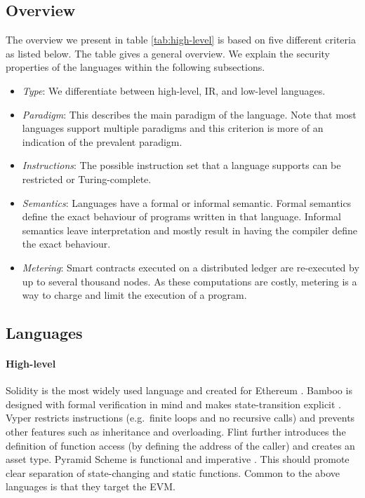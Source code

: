 \subsection{Overview}
The overview we present in table \ref{tab:high-level} is based on five different criteria as listed below. The table gives a general overview. We explain the security properties of the languages within the following subsections.
\begin{itemize}
\item \emph{Type}: We differentiate between high-level, IR, and low-level languages.
\item \emph{Paradigm}: This describes the main paradigm of the language. Note that most languages support multiple paradigms and this criterion is more of an indication of the prevalent paradigm.
\item \emph{Instructions}: The possible instruction set that a language supports can be restricted or Turing-complete.
\item \emph{Semantics}: Languages have a formal or informal semantic. Formal semantics define the exact behaviour of programs written in that language. Informal semantics leave interpretation and mostly result in having the compiler define the exact behaviour.
\item \emph{Metering}: Smart contracts executed on a distributed ledger are re-executed by up to several thousand nodes. As these computations are costly, metering is a way to charge and limit the execution of a program.
\end{itemize}



\subsection{Languages}

\paragraph{High-level}
Solidity is the most widely used language and created for Ethereum \cite{Ethereum2018Solidity}.
Bamboo is designed with formal verification in mind and makes state-transition explicit \cite{Hirai2018Bamboo}. 
Vyper restricts instructions (e.g.\ finite loops and no recursive calls) and prevents other features such as inheritance and overloading\cite{Ethereum2018Vyper}. 
Flint further introduces the definition of function access (by defining the address of the caller) and creates an asset type. 
Pyramid Scheme is functional and imperative \cite{Burge2018}. This should promote clear separation of state-changing and static functions.
Common to the above languages is that they target the EVM.

